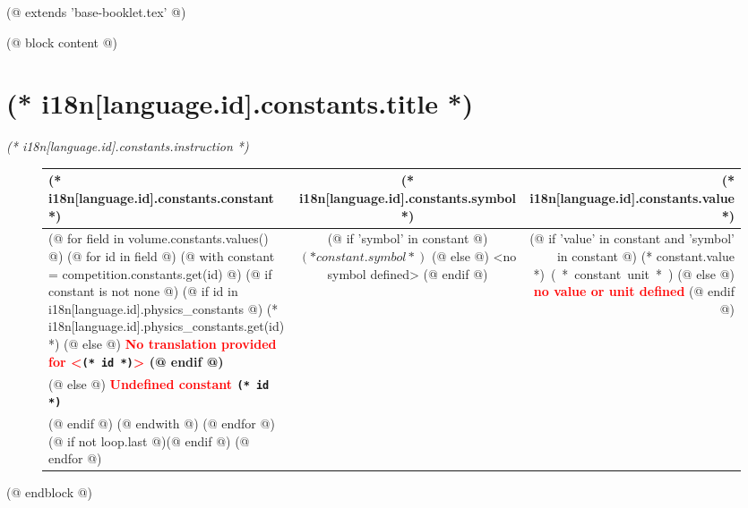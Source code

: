 (@ extends 'base-booklet.tex' @)

(@ block content @)
    \pagestyle{constants}

    \renewcommand{\arraystretch}{1.3}
    \section{(* i18n[language.id].constants.title *)}
    \emph{(* i18n[language.id].constants.instruction *)}
    \vspace*{10mm}

    \begin{figure}[H]
        \centering
        \begin{tabular*}{\textwidth}{@{\extracolsep{\fill}} l c r}
            \toprule
                (* i18n[language.id].constants.constant *) & (* i18n[language.id].constants.symbol *) & (* i18n[language.id].constants.value *) \\
            \midrule
            (@ for field in volume.constants.values() @)
                (@ for id in field @)
                    (@ with constant = competition.constants.get(id) @)
                        (@ if constant is not none @)
                            (@ if id in i18n[language.id].physics_constants @)
                                (* i18n[language.id].physics_constants.get(id) *)
                            (@ else @)
                                \bf \textcolor{red}{No translation provided for <}\verb|(* id *)|\textcolor{red}{>}
                            (@ endif @) &
                            (@ if 'symbol' in constant @)
                                $(* constant.symbol *)$
                            (@ else @)
                                <no symbol defined>
                            (@ endif @) &
                            (@ if 'value' in constant and 'symbol' in constant @)
                                \SI[(@ if 'siextra' in constant @)(* constant.siextra *)(@ endif @)]{(* constant.value *)}{(* constant.unit *)}
                            (@ else @)
                                \textbf{\textcolor{red}{no value or unit defined}}
                            (@ endif @) \\
                        (@ else @)
                            \bf \textcolor{red}{Undefined constant} \verb|(* id *)| & & \\
                        (@ endif @)
                    (@ endwith @)
                (@ endfor @)
                (@ if not loop.last @)\midrule(@ endif @)
            (@ endfor @)
            \bottomrule
        \end{tabular*}
    \end{figure}
(@ endblock @)
